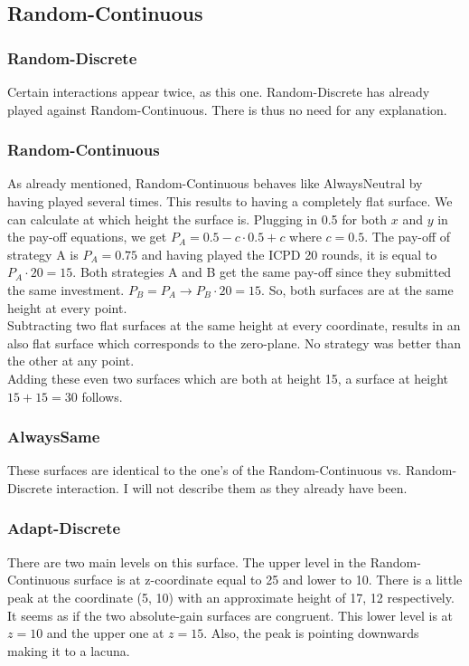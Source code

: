 \documentclass{article}
\begin{document}
\subsection{Random-Continuous}

\subsubsection*{Random-Discrete}
		Certain interactions appear twice, as this one.
		Random-Discrete has already played against Random-Continuous.
		There is thus no need for any explanation.\\
	

\subsubsection*{Random-Continuous}
		As already mentioned, Random-Continuous behaves like AlwaysNeutral by having played several times.
		This results to having a completely flat surface.
		We can calculate at which height the surface is.
		Plugging in 0.5 for both $x$ and $y$ in the pay-off equations, we get $P_A = 0.5 - c \cdot 0.5 + c$ where $c = 0.5$.
		The pay-off of strategy A is $P_A = 0.75$ and having played the ICPD 20 rounds, it is equal to $P_A \cdot 20 = 15$.
		Both strategies A and B get the same pay-off since they submitted the same investment.
		$P_B = P_A \rightarrow P_B \cdot 20 = 15$.
		So, both surfaces are at the same height at every point.\\

		Subtracting two flat surfaces at the same height at every coordinate, results in an also flat surface which corresponds to the zero-plane.
		No strategy was better than the other at any point.\\

		Adding these even two surfaces which are both at height 15, a surface at height $15 + 15 = 30$ follows.\\


\subsubsection*{AlwaysSame}
		These surfaces are identical to the one's of the Random-Continuous vs. Random-Discrete interaction.
		I will not describe them as they already have been.\\
	

\subsubsection*{Adapt-Discrete}
		There are two main levels on this surface.
		The upper level in the Random-Continuous surface is at z-coordinate equal to 25 and lower to 10.
		There is a little peak at the coordinate (5, 10) with an approximate height of 17, 12 respectively.\\
		It seems as if the two absolute-gain surfaces are congruent.
		This lower level is at $z = 10$ and the upper one at $z = 15$.
		Also, the peak is pointing downwards making it to a lacuna.\\
\end{document}
